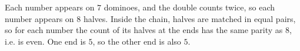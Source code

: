 Each number appears on $7$ dominoes, and the double counts twice, so each number appears on $8$ halves. Inside the chain, halves are matched in equal pairs, so for each number the count of its halves at the ends has the same parity as $8$, i.e. is even. One end is $5$, so the other end is also $\boxed{5}$.
